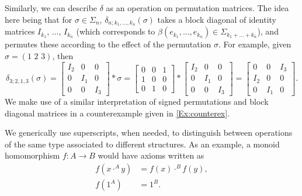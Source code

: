 \begin{remark}
Similarly, we can describe $\delta$ as an operation on permutation matrices. The idea here being that for $\sigma \in \Sigma_n$, $\delta_{n;k_1,\ldots,k_n}(\sigma)$ takes a block diagonal of identity matrices $I_{k_1}$, $\ldots$, $I_{k_n}$ (which corresponds to $\beta(e_{k_1},\ldots,e_{k_n}) \in \Sigma_{k_1+\ldots+k_n}$), and permutes these according to the effect of the permutation $\sigma$. For example, given $\sigma = (1 \,\, 2 \,\, 3)$, then
  \[
    \delta_{3;2,1,3}(\sigma) =
    \begin{bmatrix}
    I_2 & 0 & 0 \\
    0 & I_1 & 0 \\
    0 & 0 & I_3
    \end{bmatrix}
    \ast
    \sigma
    =
      \begin{bmatrix}
      0 & 0 & 1 \\
      1 & 0 & 0 \\
      0 & 1 & 0
      \end{bmatrix}
    \ast
    \begin{bmatrix}
    I_2 & 0 & 0 \\
    0 & I_1 & 0 \\
    0 & 0 & I_3
    \end{bmatrix}
    =
    \begin{bmatrix}
    0 & 0 & I_3 \\
    I_2 & 0 & 0 \\
    0 & I_1 & 0
    \end{bmatrix}.
  \]
We make use of a similar interpretation of signed permutations and block diagonal matrices in a counterexample given in \cref{Ex:counterex}.
\end{remark}

\begin{conv}[(Superscripts)]\label{conv:superscripts}
We generically use superscripts, when needed, to distinguish between operations of the same type associated to different structures. As an example, a monoid homomorphism $f \colon A \to B$ would have axioms written as
\begin{align*}
f(x \cdot^A y) & = f(x) \cdot^B f(y), \\
f(1^A) & = 1^B.
\end{align*}
\end{conv}

